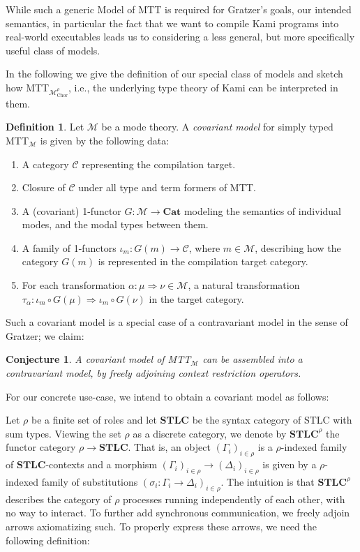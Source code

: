 \documentclass{scrartcl}
\theoremstyle{definition}
\newtheorem{definition}{Definition}
\theoremstyle{plain}
\newtheorem{conjecture}{Conjecture}
\begin{document}
While such a generic Model of MTT is required for Gratzer's goals, our intended
semantics, in particular the fact that we want to compile Kami programs into
real-world executables leads us to considering a less general, but more
specifically useful class of models.

In the following we give the definition of our special class of models and
sketch how MTT${}_{\mathcal{M}^\rho_{\textrm{Chor}}}$, i.e., the underlying type
theory of Kami can be interpreted in them.

\begin{definition}
  Let $\mathcal{M}$ be a mode theory. A \emph{covariant model} for
  simply typed MTT$_{\mathcal{M}}$ is given by the following data:
  \begin{enumerate}
  \item A category $\mathcal{C}$ representing the compilation target.
  \item Closure of $\mathcal{C}$ under all type and term formers of MTT.
  \item A (covariant) 1-functor $G : \mathcal{M} \to \textbf{Cat}$ modeling the semantics of
    individual modes, and the modal types between them.
  \item A family of 1-functors $\iota_m : G(m) \to \mathcal{C}$, where $m \in
    \mathcal{M}$, describing how the category $G(m)$ is represented in the
    compilation target category.
  \item For each transformation $\alpha : \mu \Rightarrow \nu \in \mathcal{M}$,
    a natural transformation
    $\tau_\alpha : \iota_m \circ G(\mu) \Rightarrow \iota_m \circ G(\nu)$ in the
    target category.
  \end{enumerate}
\end{definition}

Such a covariant model is a special case of a contravariant model in the sense of Gratzer; we claim:

\begin{conjecture}
  A covariant model of MTT$_{\mathcal{M}}$ can be assembled into a contravariant
  model, by freely adjoining context restriction operators.
\end{conjecture}

\medskip

For our concrete use-case, we intend to obtain a covariant model as follows:

Let $\rho$ be a finite set of roles and let $\textbf{STLC}$ be the syntax
category of STLC with sum types. Viewing the set
$\rho$ as a discrete category, we denote by $\textbf{STLC}^\rho$ the functor
category $\rho \to \textbf{STLC}$. That is, an object $(\Gamma_i)_{i\in\rho}$
is a $\rho$-indexed family of $\textbf{STLC}$-contexts and a morphism
$(\Gamma_i)_{i\in\rho} \to (\Delta_i)_{i\in\rho}$ is given by a $\rho$-indexed
family of substitutions $(\sigma_i : \Gamma_i \to \Delta_i)_{i\in\rho}$. The
intuition is that $\textbf{STLC}^\rho$ describes the category of $\rho$
processes running independently of each other, with no way to interact. To
further add synchronous communication, we freely adjoin arrows axiomatizing
such. To properly express these arrows, we need the following definition:
\end{document}
